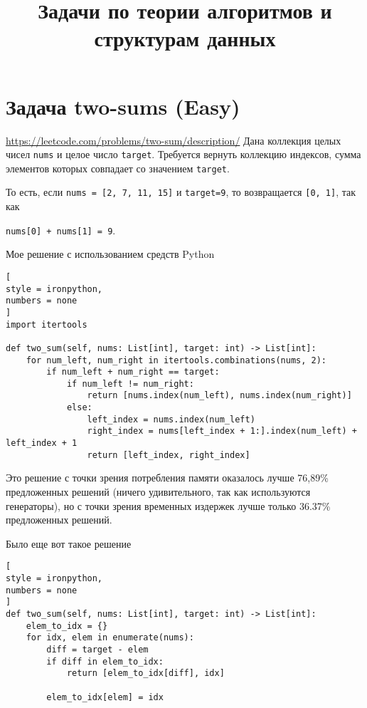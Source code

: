 \documentclass[%
	11pt,
	a4paper,
	utf8,
		]{article}
\begin{document}
\title{Задачи по теории алгоритмов и структурам данных}

\author{}

\date{}
\maketitle

\thispagestyle{fancy}

\tableofcontents

\section{Задача two-sums (Easy)}

\noindent\url{https://leetcode.com/problems/two-sum/description/} Дана коллекция целых чисел \verb|nums| и целое число \verb|target|. Требуется вернуть коллекцию индексов, сумма элементов которых совпадает со значением \verb|target|.

То есть, если \verb|nums = [2, 7, 11, 15]| и \verb|target=9|, то возвращается \verb|[0, 1]|, так как 

\verb|nums[0] + nums[1] = 9|.

Мое решение с использованием средств Python
\begin{lstlisting}[
style = ironpython,
numbers = none
]
import itertools

def two_sum(self, nums: List[int], target: int) -> List[int]:
	for num_left, num_right in itertools.combinations(nums, 2):
		if num_left + num_right == target:
			if num_left != num_right:
				return [nums.index(num_left), nums.index(num_right)]
			else:
				left_index = nums.index(num_left)
				right_index = nums[left_index + 1:].index(num_left) + left_index + 1
				return [left_index, right_index]
\end{lstlisting}

Это решение с точки зрения потребления памяти оказалось лучше 76,89\% предложенных решений (ничего удивительного, так как используются генераторы), но с точки зрения временных издержек лучше только 36.37\% предложенных решений.

Было еще вот такое решение
\begin{lstlisting}[
style = ironpython,
numbers = none
]
def two_sum(self, nums: List[int], target: int) -> List[int]:
	elem_to_idx = {}
	for idx, elem in enumerate(nums):
		diff = target - elem
		if diff in elem_to_idx:
			return [elem_to_idx[diff], idx]
			
		elem_to_idx[elem] = idx
\end{lstlisting}
\end{document}
